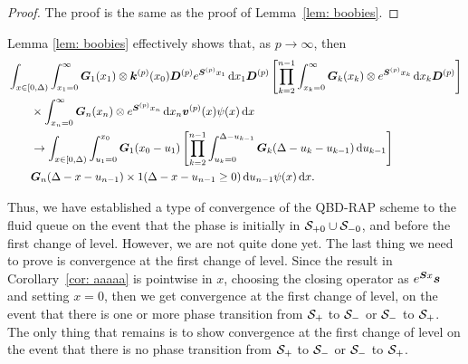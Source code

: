 \begin{proof}
	The proof is the same as the proof of Lemma~\ref{lem: boobies}.
\end{proof}
Lemma \ref{lem: boobies} effectively shows that, as \(p \to \infty\), then 
\begin{align}
	&\int_{x\in[0,\Delta)} \int_{x_1=0}^\infty \bs G_1(x_1) \otimes \bs k^{(p)} (x_0) \bs D^{(p)} e^{\bs{S}^{(p)}x_1}\wrt x_1\bs D^{(p)} 
			\left[\prod_{k=2}^{n-1}\int_{x_k=0}^\infty \bs G_{k}(x_k) \otimes e^{\bs{S}^{(p)}x_k} \wrt x_k
	\bs D^{(p)} \right] \nonumber 
			\\&\qquad{}\times\int_{x_n=0}^\infty \bs G_{n}(x_n) \otimes e^{\bs{S}^{(p)}x_n} \wrt x_n {\bs v}^{(p)}(x) \psi(x)\wrt x \nonumber 
%
	\\&\qquad {}\to \int_{x\in[0,\Delta)} \int_{u_1=0}^{x_0}\bs G_1(x_0 - u_1)
	\left[\prod_{k=2}^{n-1} \int_{u_k=0}^{\Delta-u_{k-1}} \bs {G}_{k}(\Delta-u_k-u_{k-1})\wrt u_{k-1}\right] \nonumber 
			\\&\qquad{} \bs G_{n}(\Delta - x-u_{n-1})
		 \times1(\Delta-x-u_{n-1}\geq0)\wrt u_{n-1}\psi(x)\wrt x.  \nonumber
\end{align}

Thus, we have established a type of convergence of the QBD-RAP scheme to the fluid queue on the event that the phase is initially in \(\mathcal{S}_{+0}\cup\mathcal{S}_{-0}\), and before the first change of level. However, we are not quite done yet. The last thing we need to prove is convergence at the first change of level. Since the result in Corollary~\ref{cor: aaaaa} is pointwise in \(x\), choosing the closing operator as \(e^{\boldsymbol Sx}\boldsymbol s\) and setting \(x=0\), then we get convergence at the first change of level, on the event that there is one or more phase transition from \(\mathcal{S}_+\) to \(\mathcal{S}_-\) or \(\mathcal{S}_-\) to \(\mathcal{S}_+\). The only thing that remains is to show convergence at the first change of level on the event that there is no phase transition from \(\mathcal{S}_+\) to \(\mathcal{S}_-\) or \(\mathcal{S}_-\) to \(\mathcal{S}_+\). 

